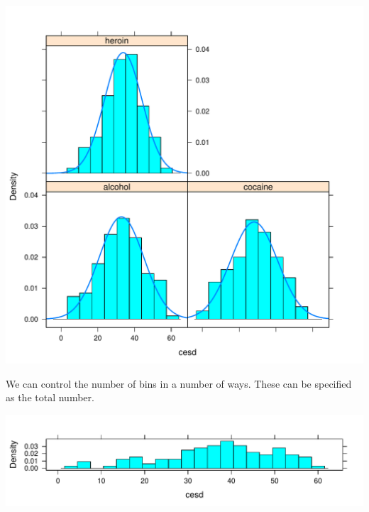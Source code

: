 \begin{solution}
\begin{knitrout}
\color{fgcolor}\begin{kframe}
\begin{alltt}
\hlstd{(}\hlopt{~}  \hlopt{|}  \hlstd{=}\hlstd{,}
  \hlstd{=}\hlopt{==}\hlstd{))}
\end{alltt}
\end{kframe}
\includegraphics[width=\maxwidth]{figure/subsmale-1} 

\end{knitrout}
\end{solution}%
We can control the number of bins in a number of ways.  These can be specified 
as the total number.
%
\begin{center}
\begin{knitrout}
\color{fgcolor}\begin{kframe}
\begin{alltt}
\hlstd{(}\hlopt{~}  \hlstd{=}\hlstd{,} 
\end{alltt}
\end{kframe}
\includegraphics[width=\maxwidth]{figure/cesd-dot-1} 

\end{knitrout}
\end{center}
